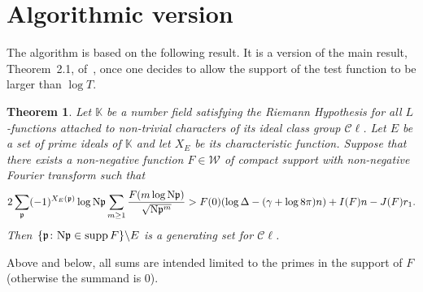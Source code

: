 \documentclass[a4paper,11pt]{amsart}
\newcommand{\field}[1]{\mathbb{{#1}}}
\newcommand{\ideal}[1]{\mathfrak{{#1}}}
\newcommand{\K}{\field{{K}}}
\newcommand{\p}{\ideal{p}}
\newcommand{\Norm}{\textrm{\upshape N}}
\newcommand{\Cl}{\mathcal C\!\ell}
\newcommand{\W}{\mathcal W}
\DeclareMathOperator{\supp}{supp}
\newtheorem{theorem}{Theorem}
\theoremstyle{remark}
\begin{document}
\section{Algorithmic version}\label{sec:6A}
The algorithm is based on the following result. It is a version of the main result, Theorem~2.1,
of~\cite{BelabasDiazyDiazFriedman}, once one decides to allow the support of the test function to be
larger than $\log T$.
%
\begin{theorem}\label{th:5A}
Let $\K$ be a number field satisfying the Riemann Hypothesis for all $L$-functions attached to
non-trivial characters of its ideal class group $\Cl$. Let $E$ be a set of prime ideals of $\K$ and let
$X_E$ be its characteristic function. Suppose that there exists a non-negative function $F\in\W$ of
compact support with non-negative Fourier transform such that
\begin{equation}
2\sum_{\p}(-1)^{X_E(\p)}\log\Norm\p\sum_{m\geq 1}\frac{F(m\log\Norm\p)}{\sqrt{\Norm\p^m}}
> F(0)(\log\Delta - (\gamma + \log 8\pi)n)
+ I(F) n
- J(F) r_1.                                                                                  \label{eq:20A}
\end{equation}
Then $\{\p\colon \Norm\p\in\supp F\}\backslash E$ is a generating set for $\Cl$.
\end{theorem}
%
Above and below, all sums are intended limited to the primes in the support of $F$ (otherwise the summand
is $0$).
%
\end{document}
